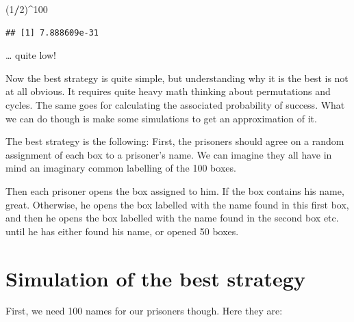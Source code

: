 \documentclass[]{book}
\newenvironment{Shaded}{\begin{snugshade}}{\end{snugshade}}
\newcommand{\DecValTok}[1]{\textcolor[rgb]{0.00,0.00,0.81}{#1}}
\newcommand{\KeywordTok}[1]{\textcolor[rgb]{0.13,0.29,0.53}{\textbf{#1}}}
\newcommand{\NormalTok}[1]{#1}
\newcommand{\OperatorTok}[1]{\textcolor[rgb]{0.81,0.36,0.00}{\textbf{#1}}}
\newcommand{\StringTok}[1]{\textcolor[rgb]{0.31,0.60,0.02}{#1}}
\begin{document}
\begin{Shaded}
\begin{Highlighting}[]
\NormalTok{(}\DecValTok{1}\OperatorTok{/}\DecValTok{2}\NormalTok{)}\OperatorTok{^}\DecValTok{100}
\end{Highlighting}
\end{Shaded}

\begin{verbatim}
## [1] 7.888609e-31
\end{verbatim}

\ldots{} quite low!

Now the best strategy is quite simple, but understanding why it is the best is not at all obvious. It requires quite heavy math thinking about permutations and cycles. The same goes for calculating the associated probability of success. What we can do though is make some simulations to get an approximation of it.

The best strategy is the following:
First, the prisoners should agree on a random assignment of each box to a prisoner's name. We can imagine they all have in mind an imaginary common labelling of the 100 boxes.

Then each prisoner opens the box assigned to him. If the box contains his name, great. Otherwise, he opens the box labelled with the name found in this first box, and then he opens the box labelled with the name found in the second box etc. until he has either found his name, or opened 50 boxes.

\hypertarget{simulation-of-the-best-strategy}{%
\section{Simulation of the best strategy}\label{simulation-of-the-best-strategy}}

First, we need 100 names for our prisoners though. Here they are:

\begin{Shaded}
\end{Shaded}
\end{document}
